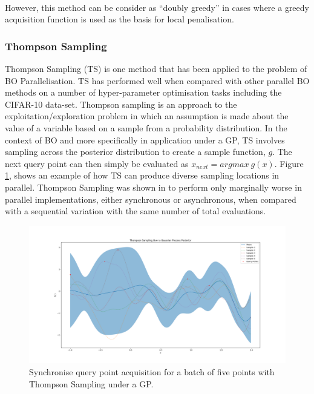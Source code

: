 \documentclass{article}
\begin{document}
			\par \(~\)

			However, this method can be consider as “doubly greedy” \cite{36} in cases where a greedy acquisition function is used as the basis for local penalisation.




		\subsubsection{Thompson Sampling}

			Thompson Sampling (TS) is one method that has been applied to the problem of BO Parallelisation\cite{26}\cite{27}. TS has performed well when compared with other parallel BO methods on a number of hyper-parameter optimisation tasks including the CIFAR-10 data-set. 
			Thompson sampling is an approach to the exploitation/exploration problem in which an assumption is made about the value of a variable based on a sample from a probability distribution. In the context of BO and more specifically in application under a GP, TS involves sampling across the posterior distribution to create a sample function, \(g\). The next query point can then simply be evaluated as \(x_{next} = argmax ~g(x)\). Figure \ref{fig:TS1}, shows an example of how TS can produce diverse sampling locations in parallel. Thompson Sampling was shown in \cite{27} to perform only marginally worse in parallel implementations, either synchronous or asynchronous, when compared with a sequential variation with the same number of total evaluations.



			\begin{figure}[h]			\label{fig:TS1}

			\includegraphics[trim=20 0 0 0 ,scale=0.25]{TS.png}

			\caption{
			Synchronise query point acquisition for a batch of five points with Thompson Sampling under a GP.
			}


			\end{figure}
\end{document}
